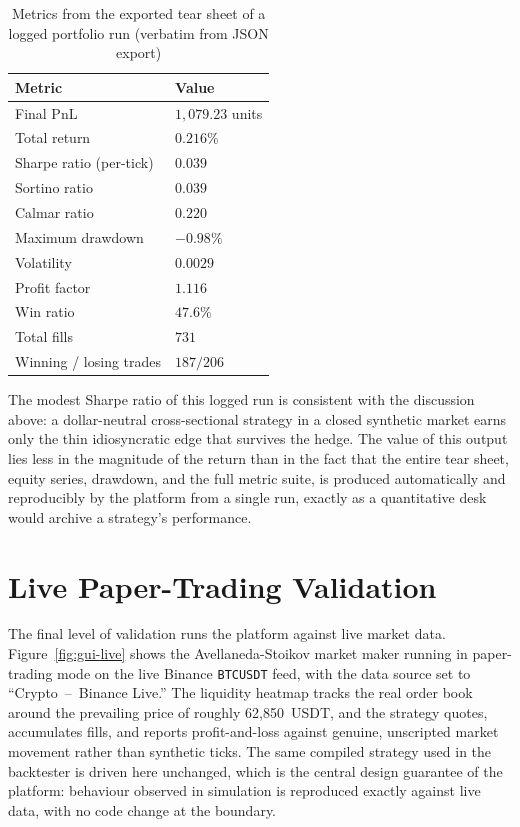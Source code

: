 \documentclass[12pt,oneside,a4paper]{report}
\begin{document}
\begin{table}[H]
\centering
\caption{Metrics from the exported tear sheet of a logged portfolio run (verbatim from JSON export)}
\label{tab:realexport}
\small
\begin{tabular}{p{2.4in}p{1.6in}}
\toprule
\textbf{Metric} & \textbf{Value} \\
\midrule
Final PnL & $1{,}079.23$ units \\
Total return & $0.216\%$ \\
Sharpe ratio (per-tick) & $0.039$ \\
Sortino ratio & $0.039$ \\
Calmar ratio & $0.220$ \\
Maximum drawdown & $-0.98\%$ \\
Volatility & $0.0029$ \\
Profit factor & $1.116$ \\
Win ratio & $47.6\%$ \\
Total fills & $731$ \\
Winning / losing trades & $187 / 206$ \\
\bottomrule
\end{tabular}
\end{table}

The modest Sharpe ratio of this logged run is consistent with the discussion above: a dollar-neutral cross-sectional strategy in a closed synthetic market earns only the thin idiosyncratic edge that survives the hedge. The value of this output lies less in the magnitude of the return than in the fact that the entire tear sheet, equity series, drawdown, and the full metric suite, is produced automatically and reproducibly by the platform from a single run, exactly as a quantitative desk would archive a strategy's performance.

\section{Live Paper-Trading Validation}
\label{sec:livevalidation}

The final level of validation runs the platform against live market data. Figure~\ref{fig:gui-live} shows the Avellaneda-Stoikov market maker running in paper-trading mode on the live Binance \texttt{BTCUSDT} feed, with the data source set to ``Crypto~--~Binance Live.'' The liquidity heatmap tracks the real order book around the prevailing price of roughly 62{,}850~USDT, and the strategy quotes, accumulates fills, and reports profit-and-loss against genuine, unscripted market movement rather than synthetic ticks. The same compiled strategy used in the backtester is driven here unchanged, which is the central design guarantee of the platform: behaviour observed in simulation is reproduced exactly against live data, with no code change at the boundary.
\end{document}
